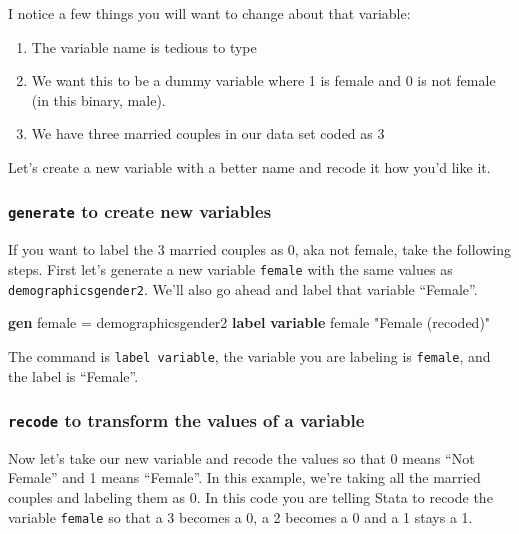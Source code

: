 \documentclass[
]{book}
\newenvironment{Shaded}{\begin{snugshade}}{\end{snugshade}}
\newcommand{\KeywordTok}[1]{\textcolor[rgb]{0.13,0.29,0.53}{\textbf{#1}}}
\newcommand{\NormalTok}[1]{#1}
\newcommand{\StringTok}[1]{\textcolor[rgb]{0.31,0.60,0.02}{#1}}
\providecommand{\tightlist}{%
  \setlength{\itemsep}{0pt}\setlength{\parskip}{0pt}}
\begin{document}
I notice a few things you will want to change about that variable:

\begin{enumerate}
\def\labelenumi{\alph{enumi})}
\tightlist
\item
  The variable name is tedious to type
\item
  We want this to be a dummy variable where 1 is female and 0 is not female (in this binary, male).
\item
  We have three married couples in our data set coded as 3
\end{enumerate}

Let's create a new variable with a better name and recode it how you'd like it.

\hypertarget{generate}{%
\subsubsection*{\texorpdfstring{\texttt{generate} to create new variables}{generate to create new variables}}\label{generate}}

If you want to label the 3 married couples as 0, aka not female, take the following steps. First let's generate a new variable \texttt{female} with the same values as \texttt{demographicsgender2}. We'll also go ahead and label that variable ``Female''.

\begin{Shaded}
\begin{Highlighting}[]
\KeywordTok{gen}\NormalTok{ female = demographicsgender2}
\KeywordTok{label} \KeywordTok{variable}\NormalTok{ female }\StringTok{"Female (recoded)"}
\end{Highlighting}
\end{Shaded}

The command is \texttt{label\ variable}, the variable you are labeling is \texttt{female}, and the label is ``Female''.

\hypertarget{recode}{%
\subsubsection*{\texorpdfstring{\texttt{recode} to transform the values of a variable}{recode to transform the values of a variable}}\label{recode}}

Now let's take our new variable and recode the values so that 0 means ``Not Female'' and 1 means ``Female''. In this example, we're taking all the married couples and labeling them as 0. In this code you are telling Stata to recode the variable \texttt{female} so that a 3 becomes a 0, a 2 becomes a 0 and a 1 stays a 1.
\end{document}

